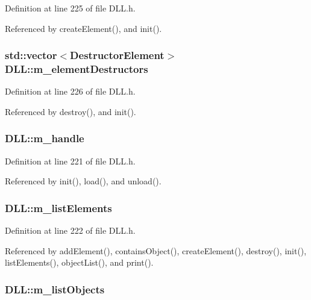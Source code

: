 Definition at line 225 of file DLL.h.

Referenced by createElement(), and init().\hypertarget{classDLL_a5004587b4dac5d0ccb0ab99b167ef159}{
\subsubsection[{m\_\-elementDestructors}]{\setlength{\rightskip}{0pt plus 5cm}std::vector$<${\bf DestructorElement}$>$ {\bf DLL::m\_\-elementDestructors}}}
\label{classDLL_a5004587b4dac5d0ccb0ab99b167ef159}


Definition at line 226 of file DLL.h.

Referenced by destroy(), and init().\hypertarget{classDLL_a2ca22015aef35c5d61f8daaf3c070154}{
\subsubsection[{m\_\-handle}]{ {\bf DLL::m\_\-handle}}}
\label{classDLL_a2ca22015aef35c5d61f8daaf3c070154}


Definition at line 221 of file DLL.h.

Referenced by init(), load(), and unload().\hypertarget{classDLL_a2e88d7167245fd7b6a000817583643ed}{
\subsubsection[{m\_\-listElements}]{ {\bf DLL::m\_\-listElements}}}
\label{classDLL_a2e88d7167245fd7b6a000817583643ed}


Definition at line 222 of file DLL.h.

Referenced by addElement(), containsObject(), createElement(), destroy(), init(), listElements(), objectList(), and print().\hypertarget{classDLL_af48201f52f29a849489e0104a440bcbb}{
\subsubsection[{m\_\-listObjects}]{ {\bf DLL::m\_\-listObjects}}}
\label{classDLL_af48201f52f29a849489e0104a440bcbb}


